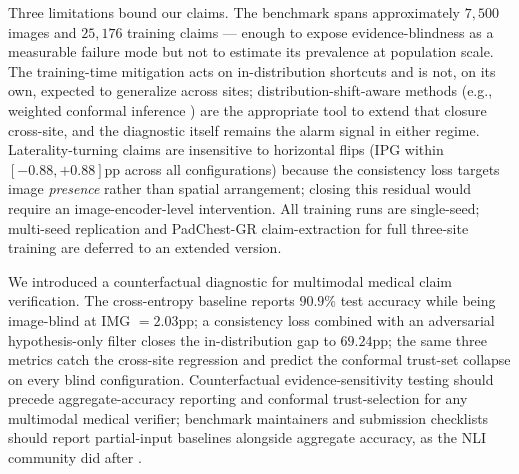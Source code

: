 \documentclass[10pt,twocolumn,letterpaper]{article}
\begin{document}
Three limitations bound our claims. The benchmark spans approximately $7{,}500$ images and $25{,}176$ training claims --- enough to expose evidence-blindness as a measurable failure mode but not to estimate its prevalence at population scale. The training-time mitigation acts on in-distribution shortcuts and is not, on its own, expected to generalize across sites; distribution-shift-aware methods (e.g., weighted conformal inference \citep{tibshirani2019conformal}) are the appropriate tool to extend that closure cross-site, and the diagnostic itself remains the alarm signal in either regime. Laterality-turning claims are insensitive to horizontal flips (IPG within $[-0.88, +0.88]$pp across all configurations) because the consistency loss targets image \emph{presence} rather than spatial arrangement; closing this residual would require an image-encoder-level intervention. All training runs are single-seed; multi-seed replication and PadChest-GR claim-extraction for full three-site training are deferred to an extended version.

We introduced a counterfactual diagnostic for multimodal medical claim verification. The cross-entropy baseline reports $90.9\%$ test accuracy while being image-blind at IMG $=2.03$pp; a consistency loss combined with an adversarial hypothesis-only filter closes the in-distribution gap to $69.24$pp; the same three metrics catch the cross-site regression and predict the conformal trust-set collapse on every blind configuration. Counterfactual evidence-sensitivity testing should precede aggregate-accuracy reporting and conformal trust-selection for any multimodal medical verifier; benchmark maintainers and submission checklists should report partial-input baselines alongside aggregate accuracy, as the NLI community did after \citep{gururangan2018annotation,poliak2018hypothesis}.

{\setlength{\bibsep}{0.3em}
\footnotesize

}
\end{document}
